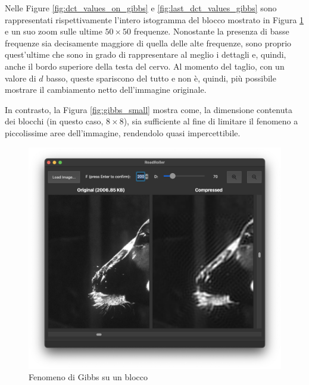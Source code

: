 Nelle Figure \ref{fig:dct_values_on_gibbs} e \ref{fig:last_dct_values_gibbs} sono rappresentati rispettivamente l'intero istogramma del blocco mostrato in Figura \ref{fig:gibbs} e un suo zoom sulle ultime $50 \times 50$ frequenze. Nonostante la presenza di basse frequenze sia decisamente maggiore di quella delle alte frequenze, sono proprio quest'ultime che sono in grado di rappresentare al meglio i dettagli e, quindi, anche il bordo superiore della testa del cervo. Al momento del taglio, con un valore di $d$ basso, queste spariscono del tutto e non è, quindi, più possibile mostrare il cambiamento netto dell'immagine originale.

In contrasto, la Figura \ref{fig:gibbs_small} mostra come, la dimensione contenuta dei blocchi (in questo caso, $8 \times 8$), sia sufficiente al fine di limitare il fenomeno a piccolissime aree dell'immagine, rendendolo quasi impercettibile.

\begin{figure}[h]
	\centering
	\includegraphics[width=1\linewidth]{figures/gibbs_phenomenon}
	\caption{Fenomeno di Gibbs su un blocco}
	\label{fig:gibbs}
\end{figure}

